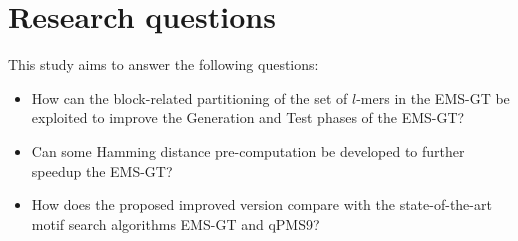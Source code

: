 \section{Research questions}

This study aims to answer the following questions:

\begin{itemize}
	\item How can the block-related partitioning of the set of $l$-mers in the EMS-GT be exploited to improve the Generation and Test phases of the EMS-GT?

	\item Can some Hamming distance pre-computation be developed to further speedup the EMS-GT?

	\item How does the proposed improved version compare with the state-of-the-art motif search algorithms EMS-GT and qPMS9?


\end{itemize}